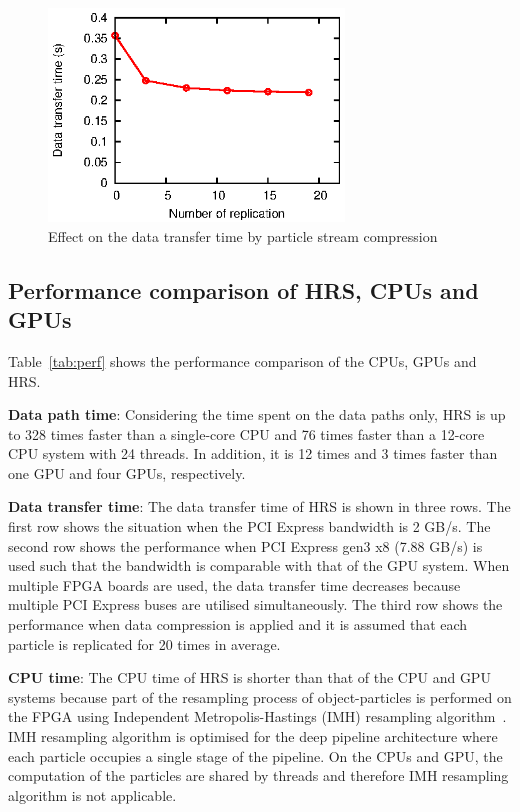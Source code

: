 \begin{figure}[t!]
\centering
\includegraphics[width=0.7\textwidth]{runtime_reconfiguration/figures/fig_compression}
\caption{Effect on the data transfer time by particle stream compression}
\label{fig:compression}
\end{figure}

\subsection{Performance comparison of HRS, CPUs and GPUs}
Table~\ref{tab:perf} shows the performance comparison of the CPUs, GPUs and HRS.

\textbf{Data path time}: Considering the time spent on the data paths only, HRS is up to 328 times faster than a single-core CPU and 76 times faster than a 12-core CPU system with 24 threads.
In addition, it is 12 times and 3 times faster than one GPU and four GPUs, respectively.

\textbf{Data transfer time}: The data transfer time of HRS is shown in three rows.
The first row shows the situation when the PCI Express bandwidth is 2 GB/s.
The second row shows the performance when PCI Express gen3 x8 (7.88 GB/s) is used such that the bandwidth is comparable with that of the GPU system.
When multiple FPGA boards are used, the data transfer time decreases because multiple PCI Express buses are utilised simultaneously.
The third row shows the performance when data compression is applied and it is assumed that each particle is replicated for 20 times in average.

\textbf{CPU time}: The CPU time of HRS is shorter than that of the CPU and GPU systems because part of the resampling process of object-particles is performed on the FPGA using Independent Metropolis-Hastings (IMH) resampling algorithm~\cite{miao11}.
IMH resampling algorithm is optimised for the deep pipeline architecture where each particle occupies a single stage of the pipeline.
On the CPUs and GPU, the computation of the particles are shared by threads and therefore IMH resampling algorithm is not applicable.

